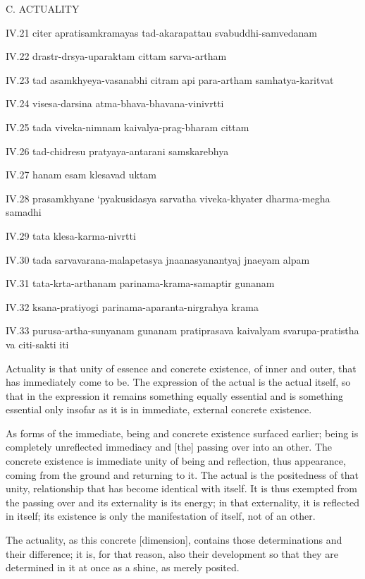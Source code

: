 C. ACTUALITY

IV.21
citer apratisamkramayas tad-akarapattau svabuddhi-samvedanam

IV.22
drastr-drsya-uparaktam cittam sarva-artham

IV.23
tad asamkhyeya-vasanabhi citram api para-artham samhatya-karitvat

IV.24
visesa-darsina atma-bhava-bhavana-vinivrtti

IV.25
tada viveka-nimnam kaivalya-prag-bharam cittam

IV.26
tad-chidresu pratyaya-antarani samskarebhya

IV.27
hanam esam klesavad uktam

IV.28
prasamkhyane ‘pyakusidasya sarvatha viveka-khyater dharma-megha samadhi

IV.29
tata klesa-karma-nivrtti

IV.30
tada sarvavarana-malapetasya jnaanasyanantyaj jnaeyam alpam

IV.31
tata-krta-arthanam parinama-krama-samaptir gunanam

IV.32
ksana-pratiyogi parinama-aparanta-nirgrahya krama

IV.33
purusa-artha-sunyanam gunanam pratiprasava kaivalyam
svarupa-pratistha va citi-sakti iti

Actuality is that unity of essence and concrete existence,
of inner and outer, that has immediately come to be.
The expression of the actual is the actual itself,
so that in the expression it remains something equally essential
and is something essential only insofar as it is
in immediate, external concrete existence.

    As forms of the immediate,
    being and concrete existence surfaced earlier;
    being is completely unreflected immediacy and
    [the] passing over into an other.
    The concrete existence is immediate unity of
    being and reflection, thus appearance,
    coming from the ground and returning to it.
    The actual is the positedness of that unity,
    relationship that has become identical with itself.
    It is thus exempted from the passing over and
    its externality is its energy;
    in that externality, it is reflected in itself;
    its existence is only the manifestation of itself,
    not of an other.

The actuality, as this concrete [dimension], contains
those determinations and their difference;
it is, for that reason, also their development
so that they are determined in it at once
as a shine, as merely posited.

